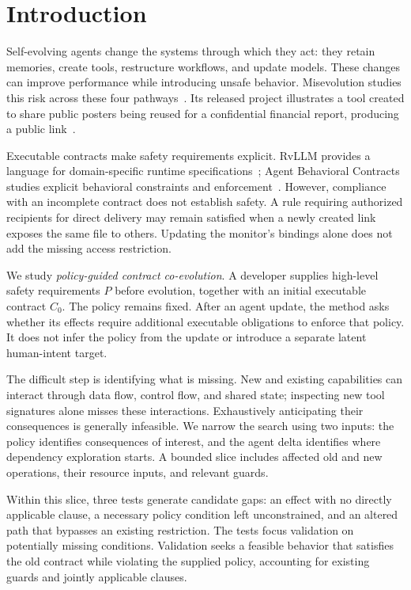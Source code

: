 \section{Introduction}
Self-evolving agents change the systems through which they act: they retain memories, create tools, restructure workflows, and update models. These changes can improve performance while introducing unsafe behavior. Misevolution studies this risk across these four pathways~\cite{shao2025misevolve}. Its released project illustrates a tool created to share public posters being reused for a confidential financial report, producing a public link~\cite{misevolutionrepo}.

Executable contracts make safety requirements explicit. RvLLM provides a language for domain-specific runtime specifications~\cite{zhang2025rvllm}; Agent Behavioral Contracts studies explicit behavioral constraints and enforcement~\cite{bhardwaj2026abc}. However, compliance with an incomplete contract does not establish safety. A rule requiring authorized recipients for direct delivery may remain satisfied when a newly created link exposes the same file to others. Updating the monitor's bindings alone does not add the missing access restriction.

We study \emph{policy-guided contract co-evolution}. A developer supplies high-level safety requirements \(P\) before evolution, together with an initial executable contract \(C_0\). The policy remains fixed. After an agent update, the method asks whether its effects require additional executable obligations to enforce that policy. It does not infer the policy from the update or introduce a separate latent human-intent target.

The difficult step is identifying what is missing. New and existing capabilities can interact through data flow, control flow, and shared state; inspecting new tool signatures alone misses these interactions. Exhaustively anticipating their consequences is generally infeasible. We narrow the search using two inputs: the policy identifies consequences of interest, and the agent delta identifies where dependency exploration starts. A bounded slice includes affected old and new operations, their resource inputs, and relevant guards.

Within this slice, three tests generate candidate gaps: an effect with no directly applicable clause, a necessary policy condition left unconstrained, and an altered path that bypasses an existing restriction. The tests focus validation on potentially missing conditions. Validation seeks a feasible behavior that satisfies the old contract while violating the supplied policy, accounting for existing guards and jointly applicable clauses.

